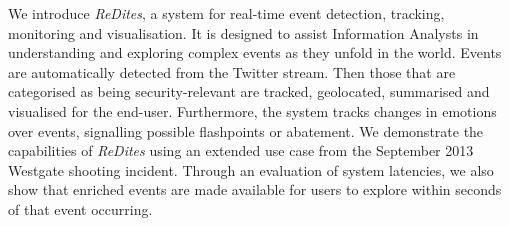 We introduce {\em ReDites}, a system for real-time event detection,
tracking, monitoring and visualisation.  It is designed to assist
Information Analysts in understanding and exploring complex events as
they unfold in the world.  Events are automatically detected from the
Twitter stream. Then those that are categorised as being
security-relevant are tracked, geolocated, summarised and visualised
for the end-user. Furthermore, the system tracks changes in emotions
over events, signalling possible flashpoints or abatement. We
demonstrate the capabilities of {\em ReDites} using an extended use case from the September 2013 Westgate shooting incident. Through an evaluation of system latencies, we also show that enriched events are made available for users to explore within seconds of that event occurring.
